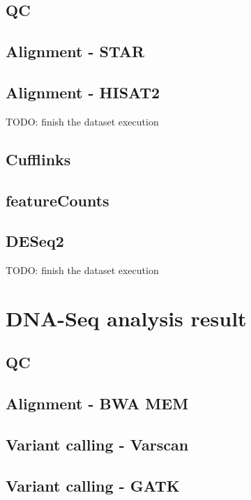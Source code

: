 \subsection{QC}

\subsection{Alignment - STAR}

\subsection{Alignment - HISAT2}

TODO: finish the dataset execution

\subsection{Cufflinks}

\subsection{featureCounts}

\subsection{DESeq2}

TODO: finish the dataset execution


\section{DNA-Seq analysis result}

\subsection{QC}

\subsection{Alignment - BWA MEM}

\subsection{Variant calling - Varscan}

\subsection{Variant calling - GATK}

